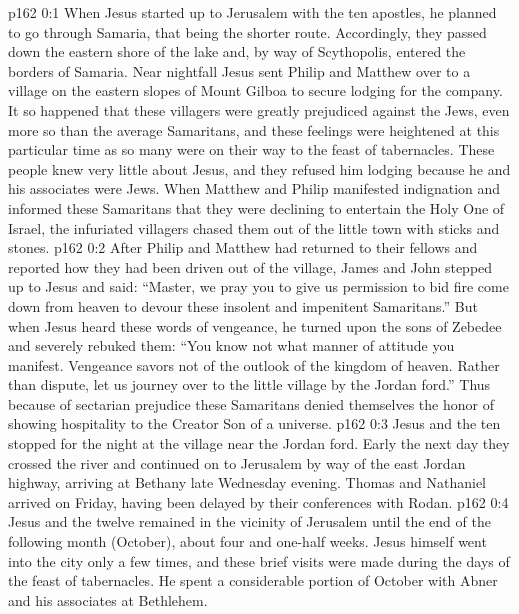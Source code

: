\author{Midwayer Commission}
\vs p162 0:1 When Jesus started up to Jerusalem with the ten apostles, he planned to go through Samaria, that being the shorter route. Accordingly, they passed down the eastern shore of the lake and, by way of Scythopolis, entered the borders of Samaria. Near nightfall Jesus sent Philip and Matthew over to a village on the eastern slopes of Mount Gilboa to secure lodging for the company. It so happened that these villagers were greatly prejudiced against the Jews, even more so than the average Samaritans, and these feelings were heightened at this particular time as so many were on their way to the feast of tabernacles. These people knew very little about Jesus, and they refused him lodging because he and his associates were Jews. When Matthew and Philip manifested indignation and informed these Samaritans that they were declining to entertain the Holy One of Israel, the infuriated villagers chased them out of the little town with sticks and stones.
\vs p162 0:2 After Philip and Matthew had returned to their fellows and reported how they had been driven out of the village, James and John stepped up to Jesus and said: “Master, we pray you to give us permission to bid fire come down from heaven to devour these insolent and impenitent Samaritans.” But when Jesus heard these words of vengeance, he turned upon the sons of Zebedee and severely rebuked them: \textcolor{ubdarkred}{“You know not what manner of attitude you manifest. Vengeance savors not of the outlook of the kingdom of heaven. Rather than dispute, let us journey over to the little village by the Jordan ford.”} Thus because of sectarian prejudice these Samaritans denied themselves the honor of showing hospitality to the Creator Son of a universe.
\vs p162 0:3 Jesus and the ten stopped for the night at the village near the Jordan ford. Early the next day they crossed the river and continued on to Jerusalem by way of the east Jordan highway, arriving at Bethany late Wednesday evening. Thomas and Nathaniel arrived on Friday, having been delayed by their conferences with Rodan.
\pc \vs p162 0:4 Jesus and the twelve remained in the vicinity of Jerusalem until the end of the following month (October), about four and one\hyp{}half weeks. Jesus himself went into the city only a few times, and these brief visits were made during the days of the feast of tabernacles. He spent a considerable portion of October with Abner and his associates at Bethlehem.\plusone
{}
